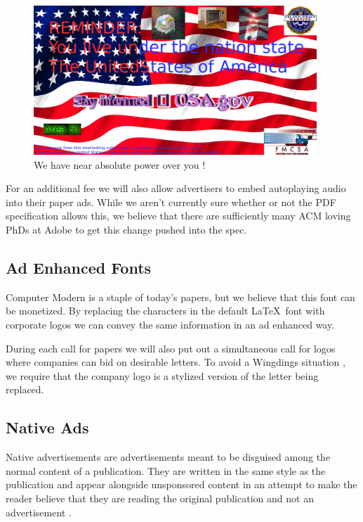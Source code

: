 \begin{figure}
\centering
\includegraphics[width=0.95\textwidth]{figures/usa-ad.png}
\caption{We have near absolute power over you \cite{eagle, kanye, microwave}!}
\label{fig:usa}
\end{figure}

For an additional fee we will also allow advertisers to embed autoplaying audio
into their paper ads.
While we aren't currently sure whether or not the PDF specification allows
this, we believe that there are sufficiently many ACM loving PhDs at Adobe to
get this change  pushed into the spec.

\subsection{Ad Enhanced Fonts}
Computer Modern is a staple of today's papers, but we believe that this font can
be monetized.
By replacing the characters in the default \LaTeX\ font with corporate logos
we can convey the same information in an ad enhanced way.

During each call for papers we will also put out a simultaneous call for
logos where companies can bid on desirable letters.
To avoid a Wingdings situation \cite{wingdings}, we require that the company
logo is a stylized version of the letter being replaced.


\subsection{Native Ads}
Native advertisements are advertisements meant to be disguised among the normal
content of a publication.
They are written in the same style as the publication and appear alongside
unsponsored content in an attempt to make the reader believe that they are
reading the original publication and not an advertisement \cite{native}.

